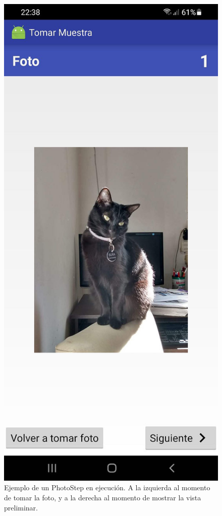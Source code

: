 \begin{figure}[H]
   \includegraphics[scale=0.23]{50-anexos/C-steps/photo_screen2.jpg}    
    \caption{Ejemplo de un PhotoStep en ejecución. A la izquierda al momento de tomar la foto, y a la derecha al momento de mostrar la vista preliminar.}
\end{figure}

